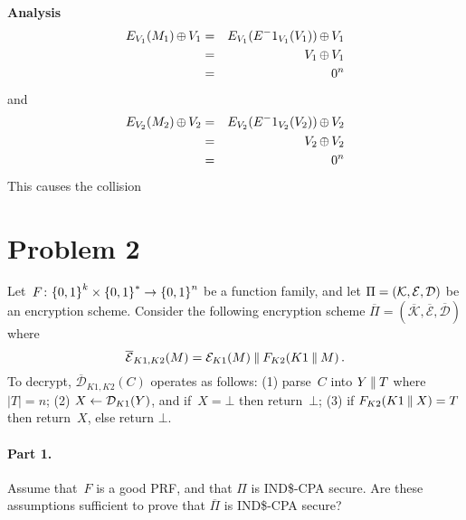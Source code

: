 \documentclass[11pt]{article}
\begin{document}
\begin{enumerate}
\textbf{Analysis}
\begin{eqnarray*}
E_{V_1}(M_1) {\,\oplus\,} V_1 &=& E_{V_1}(E^-1_{V_1}(V_1)) {\,\oplus\,} V_1 \\
&=& V_1 {\,\oplus\,} V_1 \\
&=& 0^n\\
\end{eqnarray*}
and
\begin{eqnarray*}
E_{V_2}(M_2) {\,\oplus\,} V_2 &=& E_{V_2}(E^-1_{V_2}(V_2)) {\,\oplus\,} V_2 \\
&=& V_2 {\,\oplus\,} V_2 \\
&=& 0^n\\
\end{eqnarray*}
This causes the collision\\
\end{enumerate}

\newcommand{\oPi}{\overline{\Pi}}
\newcommand{\ocalK}{\overline{\mathcal{K}}}
\newcommand{\ocalE}{\overline{\mathcal{E}}}
\newcommand{\ocalD}{\overline{\mathcal{D}}}

\vspace*{-.25in}
\section*{Problem 2} Let~$F \colon {\{0,1\}}^k \times {\{0,1\}}^* \to {\{0,1\}}^n$
be a function family, and let $\Pi = ({\cal K},{\cal E},{\cal D})$ be an
encryption scheme.  Consider the following encryption scheme $\oPi =
(\ocalK,\ocalE,\ocalD)$ where 
\[
\ocalE_{K1,K2}(M) = \calE_{K1}(M)\concat F_{K2}(K1 \concat M)\, .
\]  
To decrypt, $\ocalD_{K1,K2}(C)$
operates as follows: (1) parse~$C$ into $Y \:\|\: T$ where $|T|=n$; (2) $X
\gets {\cal D}_{K1}(Y)$, and if~$X = \bot$ then return~$\bot$; (3) if
$F_{K2}(K1 \:\|\: X)=T$ then return~$X$, else return $\bot$.

\paragraph{Part 1.} Assume that~$F$ is a good PRF, and that $\Pi$ is IND\$-CPA secure.
Are these assumptions sufficient to prove that $\oPi$ is IND\$-CPA
secure?

\newcommand{\INDR}{IND\$-CPA}
\newcommand{\ExpINDz}[2]{\mathsf{Exp}^{\mathrm{ind}\mbox{-}\mathrm{cpa0}}_{#1}{(#2)}}
\newcommand{\ExpINDo}[2]{\mathsf{Exp}^{\mathrm{ind}\mbox{-}\mathrm{cpa1}}_{#1}{(#2)}}
\newcommand{\ExpINDR}[2]{\mathsf{Exp}^{\mathrm{ind\$}\mbox{-}\mathrm{cpa}}_{#1}{(#2)}}
\newcommand{\AdvINDR}[2]{\Adv^{\mathrm{ind\$}\mbox{-}\mathrm{cpa}}_{#1}(#2)}
\newcommand{\Exp}[3]{\mathsf{Exp}^{\mathrm{#1}}_{#2}{(#3)}}
\newcommand{\Adva}[3]{\mathsf{Adv}^{\mathrm{#1}}_{#2}{(#3)}}
\end{document}
